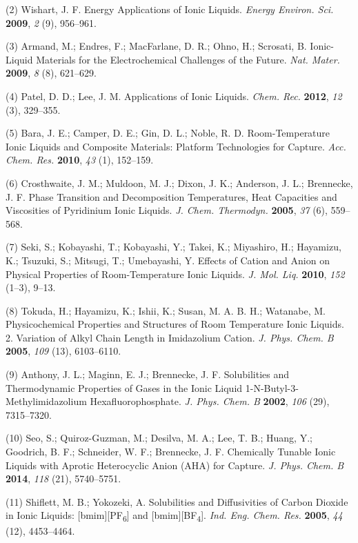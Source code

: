 \documentclass[]{article}
\begin{document}
(2) Wishart, J. F. Energy Applications of Ionic Liquids. \emph{Energy
Environ. Sci.} \textbf{2009}, \emph{2} (9), 956--961.

(3) Armand, M.; Endres, F.; MacFarlane, D. R.; Ohno, H.; Scrosati, B.
Ionic-Liquid Materials for the Electrochemical Challenges of the Future.
\emph{Nat. Mater.} \textbf{2009}, \emph{8} (8), 621--629.

(4) Patel, D. D.; Lee, J. M. Applications of Ionic Liquids. \emph{Chem.
Rec.} \textbf{2012}, \emph{12} (3), 329--355.

(5) Bara, J. E.; Camper, D. E.; Gin, D. L.; Noble, R. D.
Room-Temperature Ionic Liquids and Composite Materials: Platform
Technologies for  Capture. \emph{Acc. Chem. Res.}
\textbf{2010}, \emph{43} (1), 152--159.

(6) Crosthwaite, J. M.; Muldoon, M. J.; Dixon, J. K.; Anderson, J. L.;
Brennecke, J. F. Phase Transition and Decomposition Temperatures, Heat
Capacities and Viscosities of Pyridinium Ionic Liquids. \emph{J. Chem.
Thermodyn.} \textbf{2005}, \emph{37} (6), 559--568.

(7) Seki, S.; Kobayashi, T.; Kobayashi, Y.; Takei, K.; Miyashiro, H.;
Hayamizu, K.; Tsuzuki, S.; Mitsugi, T.; Umebayashi, Y. Effects of Cation
and Anion on Physical Properties of Room-Temperature Ionic Liquids.
\emph{J. Mol. Liq.} \textbf{2010}, \emph{152} (1--3), 9--13.

(8) Tokuda, H.; Hayamizu, K.; Ishii, K.; Susan, M. A. B. H.; Watanabe,
M. Physicochemical Properties and Structures of Room Temperature Ionic
Liquids. 2. Variation of Alkyl Chain Length in Imidazolium Cation.
\emph{J. Phys. Chem. B} \textbf{2005}, \emph{109} (13), 6103--6110.

(9) Anthony, J. L.; Maginn, E. J.; Brennecke, J. F. Solubilities and
Thermodynamic Properties of Gases in the Ionic Liquid
1-N-Butyl-3-Methylimidazolium Hexafluorophosphate. \emph{J. Phys. Chem.
B} \textbf{2002}, \emph{106} (29), 7315--7320.

(10) Seo, S.; Quiroz-Guzman, M.; Desilva, M. A.; Lee, T. B.; Huang, Y.;
Goodrich, B. F.; Schneider, W. F.; Brennecke, J. F. Chemically Tunable
Ionic Liquids with Aprotic Heterocyclic Anion (AHA) for
 Capture. \emph{J. Phys. Chem. B} \textbf{2014},
\emph{118} (21), 5740--5751.

(11) Shiflett, M. B.; Yokozeki, A. Solubilities and Diffusivities of
Carbon Dioxide in Ionic Liquids: {[}bmim{]}{[}PF\textsubscript{6}{]} and
{[}bmim{]}{[}BF\textsubscript{4}{]}. \emph{Ind. Eng. Chem. Res.}
\textbf{2005}, \emph{44} (12), 4453--4464.
\end{document}
